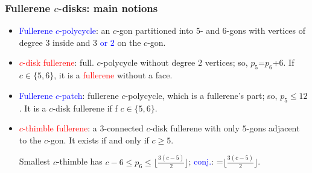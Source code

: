 \documentclass{beamer}
\begin{document}
\begin{frame}\frametitle{Fullerene $c$-disks: main notions}
\vspace{-2mm}
\begin{itemize}
\item \textcolor{blue}{Fullerene $c$-polycycle}: an $c$-gon partitioned into $5$- and $6$-gons with
vertices of
degree
$3$ inside
and $3$ \textcolor{blue}{or $2$} on the $c$-gon.
\item \textcolor{red}{$c$-disk fullerene}: full. $c$-polycycle without   degree $2$ vertices; so,
$p_5$=$p_6$+$6$. If $c\in\{5,6\}$, it is a \textcolor{red}{fullerene} without a face.
\item \textcolor{blue}{Fullerene $c$-patch}: fullerene $c$-polycycle, which is a fullerene's part;
 so, $p_5$$\le $$12$.
It is a  $c$-disk fullerene if f $c\in\{5,6\}$.



\item \textcolor{red}{$c$-thimble fullerene}: a  $3$-connected $c$-disk  fullerene
with only $5$-gons adjacent to the $c$-gon.
It exists if and only if  $c\ge 5$.
 
Smallest $c$-thimble
has $c-6$$\le$$ p_6$$\le$$\lfloor{\frac{3(c-5)}{2}} \rfloor$; \textcolor{blue}{conj.}: =$\lfloor{\frac{3(c-5)}{2}} \rfloor$.

\end{itemize}
\end{frame}
\end{document}
